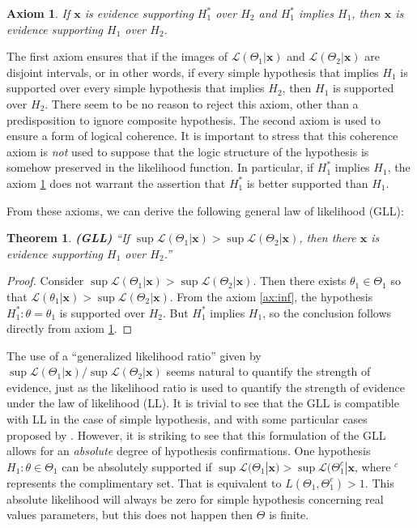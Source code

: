 \documentclass[twoside,12pt,a4paper]{article}
\newtheorem{axiom}{Axiom}[section]
\newtheorem*{theorem}{Theorem}
\newcommand{\bu}[1]{\mbox{$\mathbf{#1}$}}
\begin{document}
\begin{axiom}
	If $\bu{x}$ is evidence supporting $H_1^*$ over $H_2$ and $H_1^*$ implies $H_1$, then 
  $\bu{x}$ is evidence supporting $H_1$ over $H_2$.\label{ax:coh}
\end{axiom}

The first axiom ensures that if the images of $\mathcal{L} (\Theta_1|\bu{x})$ and 
$\mathcal{L} (\Theta_2|\bu{x})$ are disjoint intervals, or in other words, if every simple hypothesis
that implies $H_1$ is supported over every simple hypothesis that implies $H_2$, then $H_1$ is supported
over $H_2$. There seem to be no reason to reject this axiom, other than a predisposition to ignore composite
hypothesis. The second axiom is used to ensure a form of logical coherence. It is important to stress that
this coherence axiom is {\em not} used to suppose that the logic structure of the hypothesis is somehow
preserved in the likelihood function. In particular, if $H_1^*$ implies $H_1$, the axiom \ref{ax:coh} does
not warrant the assertion that $H_1^*$ is better supported than $H_1$.

From these axioms, we can derive the following general law of likelihood (GLL):

\begin{theorem}
	\textbf{(GLL)} ``If $\sup \mathcal{L} (\Theta_1 | \bu{x} ) > \sup \mathcal{L} (\Theta_2 | \bu{x})$, then
  there $\bu{x}$ is evidence supporting $H_1$ over $H_2$.'' \citep{Zhang09}
\end{theorem}

\begin{proof}
	Consider $\sup \mathcal{L} (\Theta_1 | \bu{x} ) > \sup \mathcal{L} (\Theta_2 | \bu{x})$. 
  Then there exists $\theta_1 \in \Theta_1$
	so that $\mathcal{L} (\theta_1 | \bu{x}) > \sup \mathcal{L} (\Theta_2 | \bu{x})$. 
  From the axiom \ref{ax:inf}, the hypothesis
	$H_1^* : \theta = \theta_1$ is supported over $H_2$. But $H_1^*$ implies $H_1$, so the conclusion
  follows directly from axiom \ref{ax:coh}.
\end{proof}

The use of a ``generalized likelihood ratio'' given by $\sup \mathcal{L}(\Theta_1 | \bu{x}) / 
\sup \mathcal{L} (\Theta_2 | \bu{x}) $ seems natural to quantify the strength of evidence, just as the
likelihood ratio is used to quantify the strength of evidence under the law of likelihood (LL).
It is trivial to see that the GLL is compatible with LL in the case of simple hypothesis, and with some
particular cases proposed by \citep{Royall97}. However, it is striking to see that this formulation of the 
GLL allows for an {\em absolute} degree of hypothesis confirmations. One hypothesis 
$H_1: \theta \in \Theta_1$ can be absolutely supported if $\sup \mathcal{L}(\Theta_1|\bu{x}) > 
\sup \mathcal{L} (\Theta_1^c|\bu{x}$, where $^c$ represents the complimentary set.
That is equivalent to $L(\Theta_1, \Theta_1^c) > 1$. This absolute likelihood will always be zero
for simple hypothesis concerning real values parameters, but this does not happen then $\Theta$ is finite.
\end{document}
